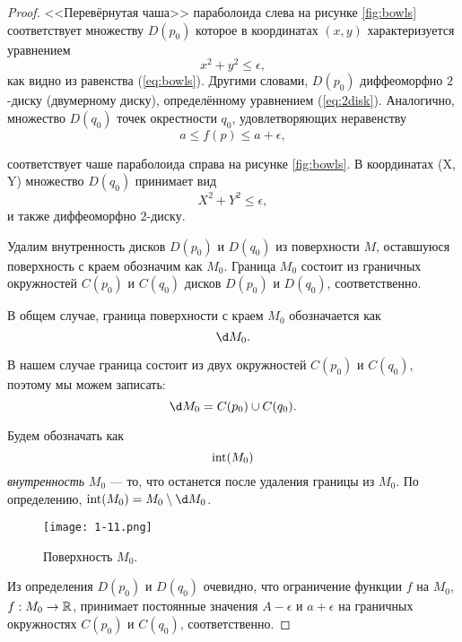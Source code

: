 \documentclass[a4paper,12pt,openany,leqno]{extbook}
\begin{document}
\begin{proof}
<<Перевёрнутая чаша>> параболоида слева на рисунке \ref{fig:bowls} соответствует множеству $D(p_0)$ которое в координатах $(x, y)$ характеризуется уравнением
\begin{equation}
x^2 + y^2 \leq \epsilon,
\label{eq:2disk}
\end{equation}
как видно из равенства (\ref{eq:bowls}). Другими словами, $D(p_0)$ диффеоморфно $2$-диску (двумерному диску), определённому уравнением (\ref{eq:2disk}). Аналогично, множество $D(q_0)$ точек окрестности $q_0$, удовлетворяющих неравенству
\begin{equation}
a \leq f(p) \leq a + \epsilon,
\end{equation}

соответствует чаше параболоида справа на рисунке \ref{fig:bowls}. В координатах (X, Y) множество $D(q_0)$ принимает вид
\begin{equation}
X^2 + Y^2 \leq \epsilon,
\label{eq:2disk2}
\end{equation}
и также диффеоморфно $2$-диску.

Удалим внутренность дисков $D(p_0)$ и $D(q_0)$ из поверхности $M$, оставшуюся поверхность с краем обозначим как $M_0$. Граница $M_0$ состоит из граничных окружностей $C(p_0)$ и $C(q_0)$ дисков $D(p_0)$ и $D(q_0)$, соответственно.

В общем случае, граница поверхности с краем $M_0$ обозначается как
\begin{equation}
\d M_0.
\end{equation}

В нашем случае граница состоит из двух окружностей $C(p_0)$ и $C(q_0)$, поэтому мы можем записать:
\begin{equation}
\d M_0 = C(p_0) \cup C(q_0).
\end{equation}

Будем обозначать как
\begin{equation}
\operatorname{int}(M_0)
\end{equation}
\emph{внутренность} $M_0$ --- то, что останется после удаления границы из $M_0$. По определению, $\inter(M_0) = M_0 \setminus \d M_0$.

\begin{figure}[t]
\texttt{[image: 1-11.png]}
\caption{Поверхность $M_0$.}
\label{fig:m0_surface}
\end{figure}

Из определения $D(p_0)$ и $D(q_0)$ очевидно, что ограничение функции $f$ на $M_0$, $f: M_0 \to \mathbb{R}$, принимает постоянные значения $A - \epsilon$ и $a + \epsilon$ на граничных окружностях $C(p_0)$ и $C(q_0)$, соответственно.


\end{proof}
\end{document}
